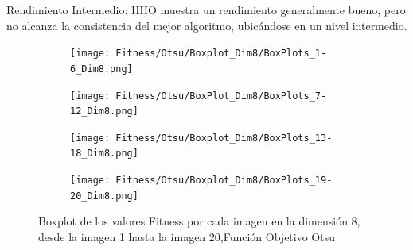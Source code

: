 \documentclass[conference]{IEEEtran}
\begin{document}
Rendimiento Intermedio: HHO muestra un rendimiento generalmente bueno, pero no alcanza la consistencia del mejor algoritmo, ubicándose en un nivel intermedio.
\begin{figure}
	\centering
	
	\begin{subfigure}{0.4\textwidth}
		\texttt{[image: Fitness/Otsu/Boxplot\_Dim8/BoxPlots\_1-6\_Dim8.png]}
	\end{subfigure}
	
	\begin{subfigure}{0.4\textwidth}
		\texttt{[image: Fitness/Otsu/BoxPlot\_Dim8/BoxPlots\_7-12\_Dim8.png]}
	\end{subfigure}
	\begin{subfigure}{0.4\textwidth}
		\texttt{[image: Fitness/Otsu/Boxplot\_Dim8/BoxPlots\_13-18\_Dim8.png]}
	\end{subfigure}
	\begin{subfigure}{0.4\textwidth}
		\texttt{[image: Fitness/Otsu/Boxplot\_Dim8/BoxPlots\_19-20\_Dim8.png]}
		\vspace{-120pt} %
	\end{subfigure}
	\caption{Boxplot de los valores Fitness por cada imagen en la dimensión 8, desde la imagen 1 hasta la imagen 20,Función Objetivo Otsu}
	\label{fig:imagenes}    
\end{figure}
\end{document}
